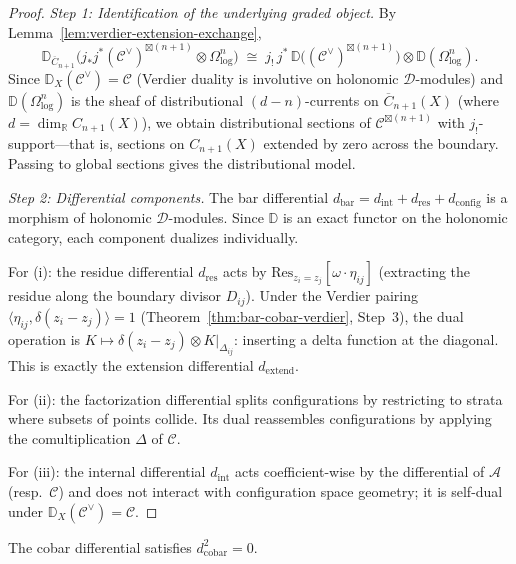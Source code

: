 \begin{proof}
\emph{Step 1: Identification of the underlying graded object.}
By Lemma~\ref{lem:verdier-extension-exchange},
\[
\mathbb{D}_{\overline{C}_{n+1}}\bigl(
  j_* j^* (\mathcal{C}^\vee)^{\boxtimes(n+1)}
  \otimes \Omega^n_{\log}
\bigr)
\;\cong\;
j_!\, j^*\, \mathbb{D}\bigl(
  (\mathcal{C}^\vee)^{\boxtimes(n+1)}
\bigr)
\otimes \mathbb{D}(\Omega^n_{\log}).
\]
Since $\mathbb{D}_X(\mathcal{C}^\vee) = \mathcal{C}$ (Verdier duality is
involutive on holonomic $\mathcal{D}$-modules) and
$\mathbb{D}(\Omega^n_{\log})$ is the sheaf of distributional $(d-n)$-currents
on $\overline{C}_{n+1}(X)$ (where $d = \dim_{\mathbb{R}} C_{n+1}(X)$), we obtain
distributional sections of $\mathcal{C}^{\boxtimes(n+1)}$ with
$j_!$-support---that is, sections on $C_{n+1}(X)$ extended by zero across the
boundary.  Passing to global sections gives the distributional model.

\emph{Step 2: Differential components.}
The bar differential $d_{\mathrm{bar}} = d_{\mathrm{int}} + d_{\mathrm{res}}
+ d_{\mathrm{config}}$ is a morphism of holonomic $\mathcal{D}$-modules.
Since $\mathbb{D}$ is an exact functor on the holonomic category, each
component dualizes individually.

For (i): the residue differential $d_{\mathrm{res}}$ acts by
$\mathrm{Res}_{z_i = z_j}[\omega \cdot \eta_{ij}]$ (extracting the residue
along the boundary divisor $D_{ij}$).  Under the Verdier pairing
$\langle \eta_{ij}, \delta(z_i - z_j)\rangle = 1$
(Theorem~\ref{thm:bar-cobar-verdier}, Step~3), the dual operation is
$K \mapsto \delta(z_i - z_j) \otimes K|_{\Delta_{ij}}$: inserting a
delta function at the diagonal.  This is exactly the extension differential
$d_{\mathrm{extend}}$.

For (ii): the factorization differential splits configurations by restricting
to strata where subsets of points collide.  Its dual reassembles
configurations by applying the comultiplication $\Delta$ of $\mathcal{C}$.

For (iii): the internal differential $d_{\mathrm{int}}$ acts
coefficient-wise by the differential of $\mathcal{A}$ (resp.\ $\mathcal{C}$)
and does not interact with configuration space geometry; it is self-dual
under $\mathbb{D}_X(\mathcal{C}^\vee) = \mathcal{C}$.
\end{proof}

\begin{corollary}[\texorpdfstring{$d_{\mathrm{cobar}}^2 = 0$}{d\_cobar\textasciicircum 2 = 0} via Verdier duality;
\ClaimStatusProvedHere]\label{cor:cobar-nilpotence-verdier}
The cobar differential satisfies $d_{\mathrm{cobar}}^2 = 0$.
\end{corollary}

